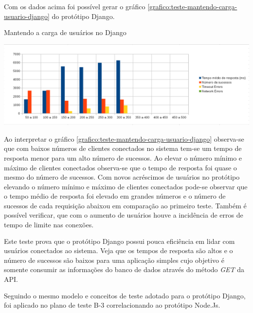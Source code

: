   Com os dados acima foi possível gerar o gráfico \ref{grafico:teste-mantendo-carga-usuario-django} do 
  protótipo Django.
  
  \begin{grafico}[H]
    \setlength{\abovecaptionskip}{5pt}
    \setlength{\belowcaptionskip}{0pt}
    \label{grafico:teste-mantendo-carga-usuario-django}
    \caption[Mantendo a carga de usuários no Django]
	    {Mantendo a carga de usuários no Django}
    \centering
    \includegraphics[width=.80\textwidth]{imagem/graficos/grafico_django_plano_de_teste_3.png}
    \captionsetup[grafico]{justification=centering}
  \end{grafico}
  
  Ao interpretar o gráfico \ref{grafico:teste-mantendo-carga-usuario-django}  observa-se que com baixos números de clientes 
  conectados no sistema tem-se um tempo de resposta menor para um alto número de sucessos. Ao elevar o número mínimo e máximo de 
  clientes conectados observa-se que o tempo de resposta foi quase o mesmo do número de sucessos. Com novos acréscimos de usuários
  no protótipo elevando o número mínimo e máximo de clientes conectados pode-se observar que o tempo médio de resposta foi elevado
  em grandes números e o número de sucessos de cada requisição abaixou em comparação ao primeiro teste. Também é possível verificar,
  que com o aumento de usuários houve a incidência de erros de tempo de limite nas conexões.
  
  Este teste prova que o protótipo Django possui pouca eficiência em lidar com usuários conectados ao sistema. Veja que os tempos de 
  resposta são altos e o número de sucessos são baixos para uma aplicação simples cujo objetivo é somente consumir as informações do banco de 
  dados através do método \textit{GET} da API.
  
  Seguindo o mesmo modelo e conceitos de teste adotado para o protótipo Django, foi aplicado no plano de teste 
  B-3 correlacionando ao protótipo Node.Js. 
  
